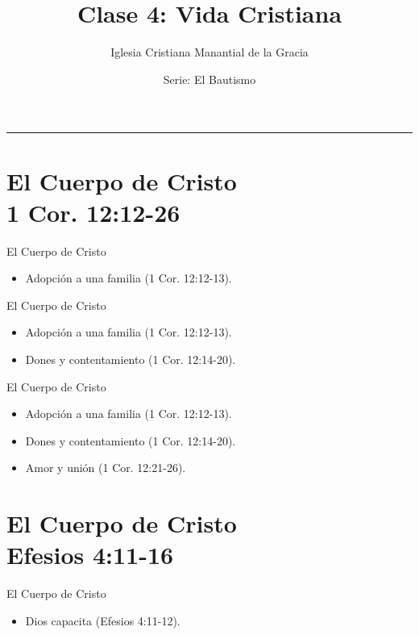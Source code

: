 \documentclass[17pt, aspectratio=169]{beamer}
\title{Clase 4: Vida Cristiana}
\author{Iglesia Cristiana Manantial de la Gracia}
\date{Serie: El Bautismo}
\begin{document}
\begin{frame}[plain]
    \titlepage
    \centering
    \color{ICMGGold}\rule{0.5\textwidth}{1pt}
\end{frame}

\section{El Cuerpo de Cristo \\ 1 Cor. 12:12-26}

\begin{frame}{El Cuerpo de Cristo}
    \begin{itemize}
        \item Adopci\'on a una familia (1 Cor. 12:12-13).
    \end{itemize}
\end{frame}

\begin{frame}{El Cuerpo de Cristo}
    \begin{itemize}
        \item Adopci\'on a una familia (1 Cor. 12:12-13).
        \item Dones y contentamiento (1 Cor. 12:14-20).
    \end{itemize}
\end{frame}

\begin{frame}{El Cuerpo de Cristo}
    \begin{itemize}
        \item Adopci\'on a una familia (1 Cor. 12:12-13).
        \item Dones y contentamiento (1 Cor. 12:14-20).
        \item Amor y uni\'on (1 Cor. 12:21-26).
    \end{itemize}
\end{frame}

\section{El Cuerpo de Cristo \\ Efesios 4:11-16}

\begin{frame}{El Cuerpo de Cristo}
    \begin{itemize}
        \item Dios capacita (Efesios 4:11-12).
    \end{itemize}
\end{frame}
\end{document}
